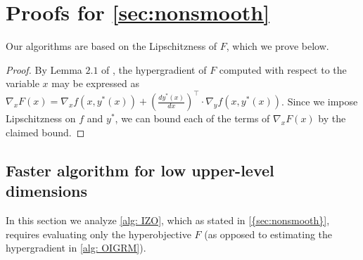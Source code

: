\section{Proofs for \cref{sec:nonsmooth}} \label{sec:alg_proof}
Our algorithms are based on the Lipschitzness of $F$, which we prove below. 
\lemLipscConstrBilevel*
\begin{proof}
    By Lemma $2.1$ of \cite{ghadimi2018approximation}, the hypergradient of $F$ computed with respect to the variable $x$ may be expressed as $\nabla_x F(x) = \nabla_x f(x, y^\ast(x)) + \left(\frac{d y^\ast(x)}{dx}\right)^\top \cdot \nabla_y f(x, y^\ast(x))$. Since we impose Lipschitzness on $f$ and $y^*$, we can bound each of the terms of $\nabla_x F(x)$ by the claimed bound. 
\end{proof}


\subsection{Faster algorithm for low upper-level dimensions}\label{sec:zeroth-order-algs}
In this section we analyze \cref{alg: IZO}, which as stated in \cref{{sec:nonsmooth}}, requires evaluating only the hyperobjective $F$ (as opposed to estimating the hypergradient in \cref{alg: OIGRM}).

